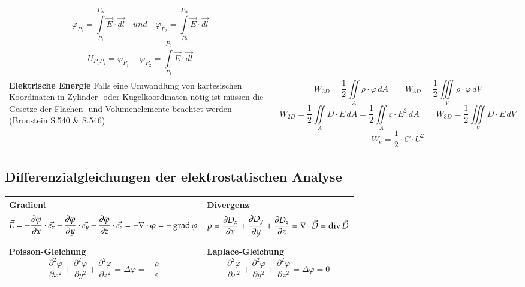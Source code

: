 \begin{tabular}{|p{} |p{}|}
	\[\varphi_{P_1} = \int\limits_{P_1}^{P_N}\vec{E}\cdot\vec{dl}\quad und \quad \varphi_{P_2} = \int\limits_{P_2}^{P_N}\vec{E}\cdot\vec{dl}\] \[U_{P_1P_2} = \varphi_{P_1} - \varphi_{P_2} = \int\limits_{P_1}^{P_2}\vec{E}\cdot\vec{dl} \]\\
	\hline
	\textbf{Elektrische Energie}\newline
	Falls eine Umwandlung von kartesischen Koordinaten in Zylinder- oder Kugelkoordinaten nötig ist müssen die Gesetze der Flächen- und Volumenelemente beachtet werden (Bronstein S.540 \& S.546)
	& \[W_{2D}=\frac{1}{2} \iint\limits_{A} \rho \cdot \varphi \, dA \quad \quad W_{3D}=\frac{1}{2} \iiint\limits_{V} \rho \cdot \varphi \, dV \]
	\[W_{2D} = \frac{1}{2} \iint\limits_{A} D \cdot  E \, dA = \frac{1}{2} \iint\limits_{A}\varepsilon\cdot E^2 \, dA\quad \quad
	W_{3D}=\frac{1}{2} \iiint\limits_{V} D \cdot E \, dV
	\]
	\[W_e = \frac{1}{2}\cdot C\cdot U^2\]\\
	\hline
\end{tabular}
\clearpage
\pagebreak
\subsection{Differenzialgleichungen der elektrostatischen Analyse}
\begin{tabular}{|p{} |p{}|}
	\hline
	\textbf{Gradient}\newline
	\[ \vec{E}= - \dfrac{\partial\varphi}{\partial x} \cdot \vec{e_{x}} -  \dfrac{\partial\varphi}{\partial y} \cdot \vec{e_{y}}- \dfrac{\partial\varphi}{\partial z} \cdot \vec{e_{z}} = -\nabla \cdot \varphi = -\operatorname{grad} \varphi\]&
	\textbf{Divergenz}\newline
	\[ \rho= \dfrac{\partial D_{x}}{\partial x} +  \dfrac{\partial D_{y}}{\partial y} + \dfrac{\partial D_{z}}{\partial z}= \nabla \cdot \vec{D}= \operatorname{div} \vec{D} \]\\
	\hline
	\textbf{Poisson-Gleichung}\newline
	\[ \dfrac{\partial^2\varphi}{\partial x^2} +  \dfrac{\partial^2\varphi}{\partial y^2} + \dfrac{\partial^2\varphi}{\partial z^2} =\Delta \varphi = -\dfrac{\rho}{\varepsilon} \]&
	\textbf{Laplace-Gleichung}  \[ \dfrac{\partial^2\varphi}{\partial x^2} +  \dfrac{\partial^2\varphi}{\partial y^2} + \dfrac{\partial^2\varphi}{\partial z^2} =\Delta \varphi = 0 \]\\
	\hline
\end{tabular}
